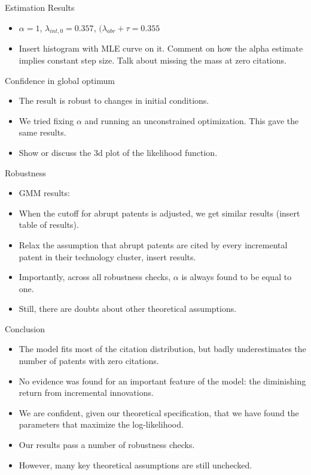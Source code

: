 \documentclass[11pt]{beamer}
\begin{document}
\begin{frame} {Estimation Results}
	\begin{itemize}\itemsep 12pt
		\item $\alpha = 1$, $\lambda_{int, 0}= 0.357 $, $(\lambda_{abr} + \tau = 0.355 $
		\item Insert histogram with MLE curve on it. Comment on how the alpha estimate implies constant step size. Talk about missing the mass at zero citations.
	\end{itemize}
\end{frame}

\begin{frame} {Confidence in global optimum}
	\begin{itemize}\itemsep 12pt
		\item The result is robust to changes in initial conditions.
		\item We tried fixing $\alpha$ and running an unconstrained optimization. This gave the same results.
		\item Show or discuss the 3d plot of the likelihood function.
	\end{itemize}
\end{frame}

\begin{frame} {Robustness}
	\begin{itemize}\itemsep 12pt
		\item GMM results: 
		\item When the cutoff for abrupt patents is adjusted, we get similar results (insert table of results).
		\item Relax the assumption that abrupt patents are cited by every incremental patent in their technology cluster, insert results.
		\item Importantly, across all robustness checks, $\alpha$ is always found to be equal to one.
		\item Still, there are doubts about other theoretical assumptions.
	\end{itemize}
\end{frame}

\begin{frame}{Conclusion}
\begin{itemize}\itemsep12pt	
		\item The model fits most of the citation distribution, but badly underestimates the number of  patents with zero citations.
		\item No evidence was found for an important feature of the model: the diminishing return from incremental innovations.
		\item We are confident, given our theoretical specification, that we have found the parameters that maximize the log-likelihood.
		\item Our results pass a number of robustness checks.
		\item However, many key theoretical assumptions are still unchecked.
	\end{itemize}
\end{frame}
\end{document}
